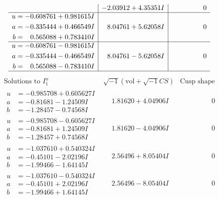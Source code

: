 \documentclass[1p]{elsarticle_modified}
\theoremstyle{definition}
\newcommand{\I}{\sqrt{-1}}
\begin{document}
$$\begin{array}{c|c|c}
 & -2.03912 + 4.35351 I & \phantom{-0.000000 } 0 \\ \hline\begin{aligned}
u &= -0.608761 + 0.981615 I \\
a &= -0.335444 + 0.466549 I \\
b &= \phantom{-}0.565088 + 0.783410 I\end{aligned}
 & \phantom{-}8.04761 + 5.62058 I & \phantom{-0.000000 } 0 \\ \hline\begin{aligned}
u &= -0.608761 - 0.981615 I \\
a &= -0.335444 - 0.466549 I \\
b &= \phantom{-}0.565088 - 0.783410 I\end{aligned}
 & \phantom{-}8.04761 - 5.62058 I & \phantom{-0.000000 } 0\\
 \hline 
 \end{array}$$\newpage$$\begin{array}{c|c|c}  
\text{Solutions to }I^u_{1}& \I (\text{vol} + \sqrt{-1}CS) & \text{Cusp shape}\\
 \hline 
\begin{aligned}
u &= -0.985708 + 0.605627 I \\
a &= -0.81681 - 1.24509 I \\
b &= -1.28457 - 0.74568 I\end{aligned}
 & \phantom{-}1.81620 + 4.04906 I & \phantom{-0.000000 } 0 \\ \hline\begin{aligned}
u &= -0.985708 - 0.605627 I \\
a &= -0.81681 + 1.24509 I \\
b &= -1.28457 + 0.74568 I\end{aligned}
 & \phantom{-}1.81620 - 4.04906 I & \phantom{-0.000000 } 0 \\ \hline\begin{aligned}
u &= -1.037610 + 0.540324 I \\
a &= -0.45101 - 2.02196 I \\
b &= -1.99466 - 1.64145 I\end{aligned}
 & \phantom{-}2.56496 + 8.05404 I & \phantom{-0.000000 } 0 \\ \hline\begin{aligned}
u &= -1.037610 - 0.540324 I \\
a &= -0.45101 + 2.02196 I \\
b &= -1.99466 + 1.64145 I\end{aligned}
 & \phantom{-}2.56496 - 8.05404 I & \phantom{-0.000000 } 0 \\ \hline\begin{aligned}

\end{aligned}
\end{array}$$
\end{document}
